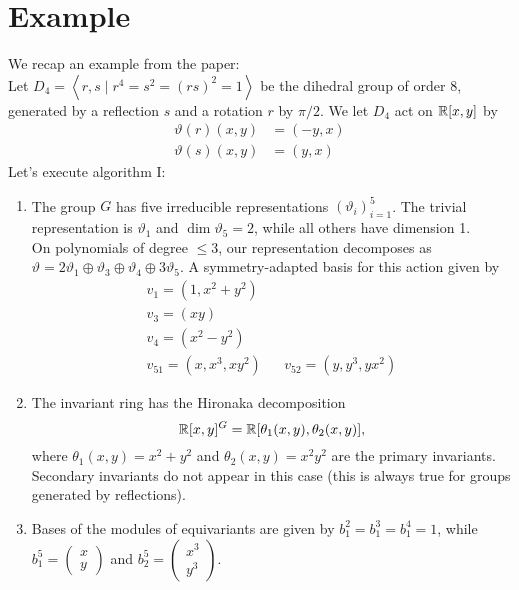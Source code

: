 \documentclass[]{article}
\begin{document}
\section{Example}
We recap an example from the paper:\\
Let $D_4=\left<r,s\mid r^4=s^2=(rs)^2=1\right>$ be the dihedral group of order $8$, generated by a reflection $s$ and a rotation $r$ by $\pi/2$. We let $D_4$ act on $\mathbb R[x,y]$ by 
\begin{align*}
    \vartheta(r)(x,y)&=(-y,x)\\
    \vartheta(s)(x,y)&=(y,x)
\end{align*}
Let's execute algorithm I:
\begin{enumerate}
    \item The group $G$ has five irreducible representations $(\vartheta_i)_{i=1}^5$. The trivial representation is $\vartheta_1$ and $\dim \vartheta_5=2$, while all others have dimension 1.\\
    On polynomials of degree $\leq3$, our representation decomposes as $\vartheta=2\vartheta_1\oplus\vartheta_3\oplus\vartheta_4\oplus3\vartheta_5$. A symmetry-adapted basis for this action given by   
    \begin{align*}
        v_1=(1,x^2+y^2)&&\\
        v_3=(xy)&&\\
        v_4=(x^2-y^2)&&\\
        v_{51}=(x,x^3,xy^2) && v_{52}=(y,y^3,yx^2)
    \end{align*}
    
    \item The invariant ring has the Hironaka decomposition
    \[
        \mathbb R[x,y]^G=\mathbb R[\theta_1(x,y),\theta_2(x,y)],
    \]
    where $\theta_1(x,y)=x^2+y^2$ and $\theta_2(x,y)=x^2y^2$ are the primary invariants. Secondary invariants do not appear in this case (this is always true for groups generated by reflections).\\ %
    
    \item Bases of the modules of equivariants are given by $b_1^2=b_1^3=b_1^4=1$, while $b_1^5=\begin{pmatrix}x\\y\end{pmatrix}$ and $b_2^5=\begin{pmatrix}x^3\\y^3\end{pmatrix}$.
    

\end{enumerate}
\end{document}
